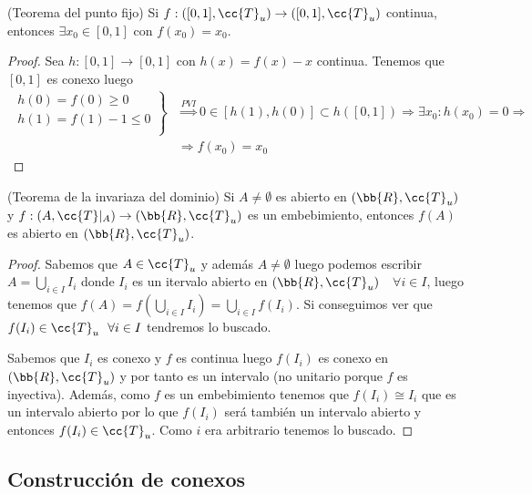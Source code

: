 \begin{teo}
    (Teorema del punto fijo) Si $f:([0,1], \cc{T}_u)\to ([0,1], \cc{T}_u)$ continua, entonces $\exists x_0 \in [0,1]$ con $f(x_0)=x_0$.
    \begin{proof}
        Sea $h:[0,1]\to [0,1]$ con $h(x)=f(x)-x$ continua. Tenemos que $[0,1]$ es conexo luego
        \begin{align*}
            \left.
            \begin{array}{c}
                h(0)=f(0)\geq 0\\
                h(1)=f(1)-1 \leq 0\\
            \end{array}
            \right\} &\overset{PVI}{\Rightarrow} 0 \in [h(1),h(0)] \subset h([0,1]) \Rightarrow \exists x_0 : h(x_0)=0 \Rightarrow \\
            &\Rightarrow f(x_0) = x_0
        \end{align*}
    \end{proof}
\end{teo}

\begin{teo}
    (Teorema de la invariaza del dominio) Si $A\neq \emptyset $ es abierto en $(\bb{R}, \cc{T}_u)$ y $f:(A, \cc{T}|_A)\to (\bb{R}, \cc{T}_u)$ es un embebimiento, entonces $f(A)$ es abierto en $(\bb{R}, \cc{T}_u)$.

    \begin{proof}
        Sabemos que $A\in \cc{T}_u$ y además $A\neq \emptyset$ luego podemos escribir $A=\bigcup\limits_{i\in I}I_i$ donde $I_i$ es un itervalo abierto en $(\bb{R}, \cc{T}_u)$\ \ $\forall i \in I$, luego tenemos que $f(A)=f(\bigcup\limits_{i\in I}I_i)=\bigcup\limits_{i\in I}f(I_i)$. Si conseguimos ver que $f(I_i)\in \cc{T}_u\ \ \forall i \in I$ tendremos lo buscado. 

        Sabemos que $I_i$ es conexo y $f$ es continua luego $f(I_i)$ es conexo en $(\bb{R}, \cc{T}_u)$ y por tanto es un intervalo (no unitario porque $f$ es inyectiva). Además, como $f$ es un embebimiento tenemos que $f(I_i)\cong I_i$ que es un intervalo abierto por lo que $f(I_i)$ será también un intervalo abierto y entonces $f(I_i)\in \cc{T}_u$. Como $i$ era arbitrario tenemos lo buscado.

    \end{proof}
\end{teo}

\subsection{Construcción de conexos}

